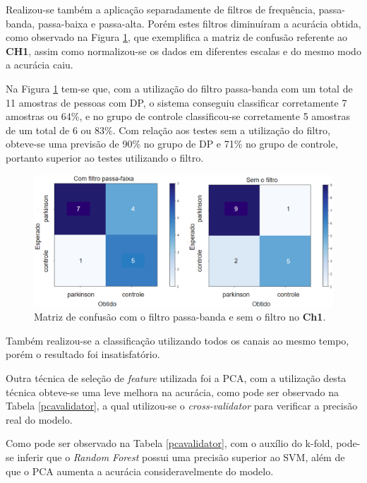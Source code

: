 Realizou-se também a aplicação separadamente de filtros de frequência, passa-banda, passa-baixa e passa-alta. Porém estes filtros diminuíram a acurácia obtida, como observado na Figura \ref{comesemfiltro}, que exemplifica a matriz de confusão referente ao \textbf{CH1}, assim como normalizou-se os dados em diferentes escalas e do mesmo modo a acurácia caiu. 

Na Figura \ref{comesemfiltro} tem-se que, com a utilização do filtro passa-banda com um total de 11 amostras de pessoas com DP, o sistema conseguiu classificar corretamente 7 amostras ou 64\%, e no grupo de controle classificou-se corretamente 5 amostras de um total de 6 ou 83\%. Com relação aos testes sem a utilização do filtro, obteve-se uma previsão de 90\% no grupo de DP e 71\% no grupo de controle, portanto superior ao testes utilizando o filtro.




\begin{figure}[t]
    \centering
    \includegraphics[width=1\textwidth]{figuras/comesemfiltro.eps}
    \caption{Matriz de confusão com o filtro passa-banda e sem o filtro no \textbf{Ch1}.}
    \label{comesemfiltro}
\end{figure}

Também realizou-se a classificação utilizando todos os canais ao mesmo tempo, porém o resultado foi insatisfatório.

Outra técnica de seleção de \textit{feature} utilizada foi a PCA, com a utilização desta técnica obteve-se uma leve melhora na acurácia, como pode ser observado na Tabela \ref{pcavalidator}, a qual utilizou-se o \textit{cross-validator} para verificar a precisão real do modelo.

Como pode ser observado na Tabela \ref{pcavalidator}, com o auxílio do k-fold, pode-se inferir que o \textit{Random Forest} possui uma precisão superior ao SVM, além de que o PCA aumenta a acurácia consideravelmente do modelo.


